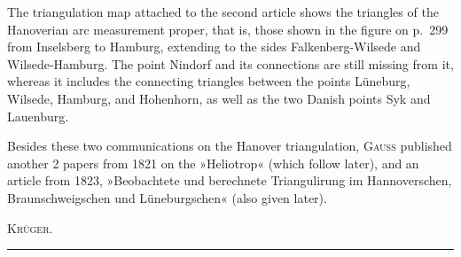 \par\noindent\hspace*{\parindent}The triangulation map attached to the second article shows the triangles of the Hanoverian arc measurement proper, that is, those shown in the figure on p.~299 from Inselsberg to Hamburg, extending to the sides Falkenberg-Wilsede and Wilsede-Hamburg. The point Nindorf and its connections are still missing from it, whereas it includes the connecting triangles between the points Lüneburg, Wilsede, Hamburg, and Hohenhorn, as well as the two Danish points Syk and Lauenburg.
\par\noindent\hspace*{\parindent}Besides these two communications on the Hanover triangulation, \textsc{Gauss} published another 2 papers from 1821 on the »Heliotrop« (which follow later), and an article from 1823, »Beobachtete und berechnete Triangulirung im Hannoverschen, Braunschweigschen und Lüneburgschen« (also given later).
\par\noindent\hfill\textsc{Krüger}.\par
\endgroup
\begin{center}\rule{.16\linewidth}{.4pt}\end{center}
